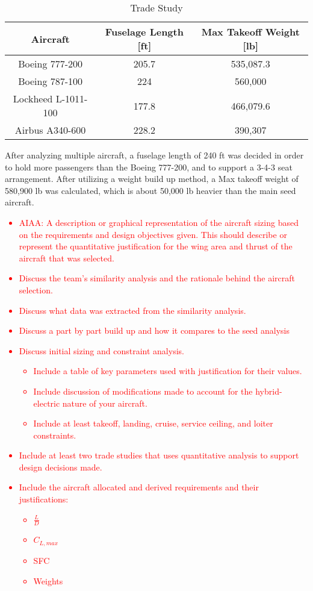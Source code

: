\begin{table}[h!] 
    \centering
    \caption{Trade Study}
    \begin{tabular}{ |c||c||c| }\toprule
    \textbf{Aircraft} & \textbf{Fuselage Length [ft]} & \textbf{Max Takeoff Weight [lb]} \\\hline\hline
    Boeing 777-200 & 205.7 & 535,087.3  \\\hline
    Boeing 787-100 & 224 & 560,000  \\\hline
    Lockheed L-1011-100 & 177.8 & 466,079.6  \\\hline
    Airbus A340-600 & 228.2 & 390,307  \\\hline

    \end{tabular}\label{tab:req}
\end{table}

After analyzing multiple aircraft, a fuselage length of 240 ft was decided in order to hold more passengers than the Boeing 777-200, and to support a 3-4-3 seat arrangement. After utilizing a weight build up method, a Max takeoff weight of 580,900 lb was calculated, which is about 50,000 lb heavier than the main seed aircraft. 

\textcolor{red}{\begin{itemize}
    \item AIAA: A description or graphical representation of the aircraft sizing based on the
requirements and design objectives given. This should describe or represent the
quantitative justification for the wing area and thrust of the aircraft that was selected.
    \item Discuss the team’s similarity analysis and the rationale behind the aircraft selection.
    \item Discuss what data was extracted from the similarity analysis.
    \item Discuss a part by part build up and how it compares to the seed analysis
    \item Discuss initial sizing and constraint analysis.
    \begin{itemize}
        \item Include a table of key parameters used with justification for their values.
        \item Include discussion of modifications made to account for the hybrid-electric nature of your aircraft.
        \item Include at least takeoff, landing, cruise, service ceiling, and loiter constraints.
    \end{itemize}
    \item Include at least two trade studies that uses quantitative analysis to support design decisions made.
    \item Include the aircraft allocated and derived requirements and their justifications:
    \begin{itemize}
        \item $\frac{L}{D}$
        \item $C_{L,max}$
        \item SFC
        \item Weights
    \end{itemize}
\end{itemize}}